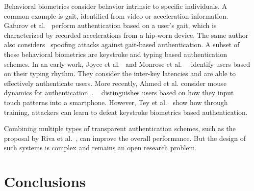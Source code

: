 \documentclass[conference]{IEEEtran}
\begin{document}
Behavioral biometrics consider behavior intrinsic to specific individuals. A common example is gait, identified from video or acceleration information. Gafurov et al.~\cite{gafurov2006biometric} perform authentication based on a user's gait, which is characterized by recorded accelerations from a hip-worn device. The same author also considers~\cite{gafurov2007spoof} spoofing attacks against gait-based authentication.
A subset of these behavioral biometrics are keystroke and typing based authentication schemes. In an early work, Joyce et al.~\cite{joyce1990identity} and Monrose et al.~\cite{monrose2000keystroke}~\cite{monrose2002password} identify users based on their typing rhythm. They consider the inter-key latencies and are able to effectively authenticate users. More recently, Ahmed et al. consider mouse dynamics for authentication~\cite{ahmed2007new}. ~\cite{de2012touch} distinguishes users based on how they input touch patterns into a smartphone. However, Tey et al.~\cite{tey2013can} show how through training, attackers can learn to defeat keystroke biometrics based authentication.

Combining multiple types of transparent authentication schemes, such as the proposal by Riva et al.~\cite{DBLP:conf/uss/RivaQSL12}, can improve the overall performance. But the design of such systems is complex and remains an open research problem.\\
 
\section{Conclusions}
\end{document}
